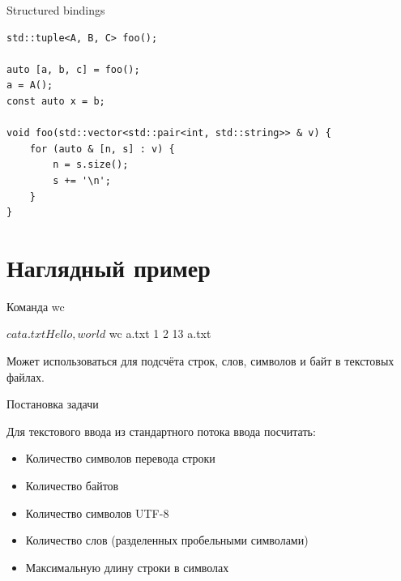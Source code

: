 \documentclass[unknownkeysallowed,xcolor=table]{beamer}
\begin{document}
\begin{frame}[fragile]{Structured bindings}

\begin{lstlisting}
std::tuple<A, B, C> foo();

auto [a, b, c] = foo();
a = A();
const auto x = b;

void foo(std::vector<std::pair<int, std::string>> & v) {
    for (auto & [n, s] : v) {
        n = s.size();
        s += '\n';
    }
}
\end{lstlisting}

\end{frame}


\section{Наглядный пример}

\begin{frame}[fragile]{Команда wc}

\begin{cmdline}
$ cat a.txt
Hello, world
$ wc a.txt
       1       2      13 a.txt
\end{cmdline}

\vspace{2em}

Может использоваться для подсчёта строк, слов, символов и байт в текстовых файлах.

\end{frame}

\begin{frame}{Постановка задачи}

Для текстового ввода из стандартного потока ввода посчитать:

\vspace{1em}

\begin{itemize}
  \item Количество символов перевода строки \vspace{0.5em}
  \item Количество байтов \vspace{0.5em}
  \item Количество символов UTF-8 \vspace{0.5em}
  \item Количество слов (разделенных пробельными символами) \vspace{0.5em}
  \item Максимальную длину строки в символах
\end{itemize}

\end{frame}
\end{document}
